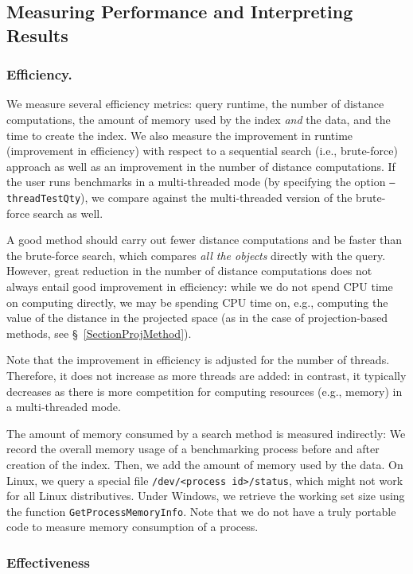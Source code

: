 \documentclass[runningheads,a4paper]{llncs}
\newcommand{\ttt}[1]{\texttt{#1}}
\begin{document}
{\subsection{Measuring Performance and Interpreting Results}\label{SectionMeasurePerf}
\subsubsection{Efficiency.} We measure several efficiency metrics: query runtime, the number of distance computations,
the amount of memory used by the index \emph{and} the data, and the time to create the index.
We also measure the improvement in runtime (improvement in efficiency) 
with respect to a sequential search (i.e., brute-force) approach
as well as an improvement in the number of distance computations. 
If the user runs benchmarks in a multi-threaded mode (by specifying the option \ttt{--threadTestQty}),
we compare against the multi-threaded version of the brute-force search as well.

A good method should
carry out fewer distance computations and be faster than the brute-force search,
which compares \emph{all the objects} directly with the query. 
However, great reduction in the number of distance computations 
does not always entail good improvement in efficiency:
while we do not spend CPU time on computing directly,
we may be spending CPU time on, e.g., computing the value of the distance 
in the projected space (as
in the case of projection-based methods, see \S~\ref{SectionProjMethod}).

Note that the improvement in efficiency is adjusted for the number of threads.
Therefore, it does not increase as more threads are added: in contrast,
it typically decreases as there is more competition for computing resources (e.g., memory)
in a multi-threaded mode.

The amount of memory consumed by a search method is measured indirectly: 
We record the overall memory usage of a benchmarking process before and after creation of the index. Then, we add the amount of memory used by the data.
On Linux,  we query a special file \ttt{/dev/<process id>/status},
which might not work for all Linux distributives.
Under Windows, we retrieve the working set size using the function
\ttt{GetProcessMemoryInfo}.
Note that we do not have  a truly portable code to measure memory consumption of a process.

\subsubsection{Effectiveness}
\label{SectionEffect}

}
\end{document}
